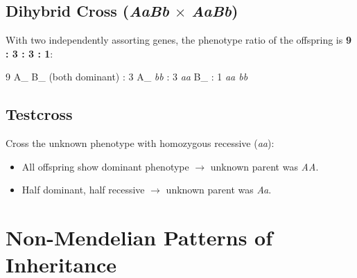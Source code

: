 \documentclass[11pt, letterpaper]{article}
\begin{document}
\subsection*{Dihybrid Cross (\textit{AaBb} $\times$ \textit{AaBb})}
With two independently assorting genes, the phenotype ratio of the offspring is
\textbf{9 : 3 : 3 : 1}:
\begin{center}
9 A\_ B\_ (both dominant) : 3 A\_ \textit{bb} : 3 \textit{aa} B\_ : 1 \textit{aa bb}
\end{center}

\subsection*{Testcross}
Cross the unknown phenotype with homozygous recessive (\textit{aa}):
\begin{itemize}[noitemsep]
  \item All offspring show dominant phenotype $\to$ unknown parent was \textit{AA}.
  \item Half dominant, half recessive $\to$ unknown parent was \textit{Aa}.
\end{itemize}

\section*{Non-Mendelian Patterns of Inheritance}
\end{document}

